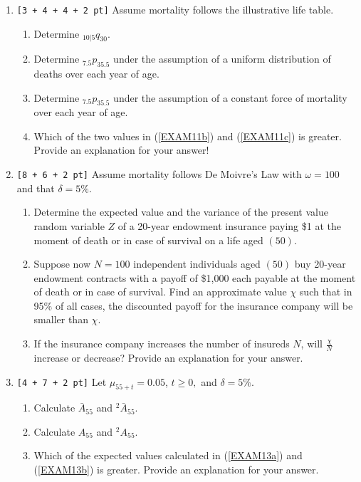 \documentclass[11pt,fleqn,oneside]{book}
\begin{document}
\begin{enumerate}

\item {\tt [3 + 4 + 4 + 2 pt]} Assume mortality follows the illustrative life table.
\begin{enumerate}
\item Determine $_{10|5}q_{30}$.
\item \label{EXAM11b} Determine ${_{7.5}p_{35.5}}$ under the assumption of a uniform distribution of deaths over each year of age.
\item \label{EXAM11c} Determine ${_{7.5}p_{35.5}}$ under the assumption of a constant force of mortality over each year of age.
\item Which of the two values in (\ref{EXAM11b}) and (\ref{EXAM11c}) is greater. Provide an explanation for your answer!
\end{enumerate}
 

\item {\tt [8 + 6 + 2 pt]} Assume mortality follows De Moivre's Law with $\omega = 100$ and that $\delta = 5\%$.
\begin{enumerate}
\item Determine the expected value and the variance of the present value random variable $Z$ of a 20-year endowment insurance paying \$1 at the moment of death or in case of survival on a life aged $(50)$.
\item Suppose now $N=100$ independent individuals aged $(50)$ buy 20-year endowment contracts with a payoff of \$1,000 each payable at the moment of death or in case of survival. Find an approximate value $\chi$ such that in 95\% of all cases, the discounted payoff for the insurance company will be smaller than ${\chi}$.
\item If the insurance company increases the number of insureds $N$, will $\frac{\chi}{N}$ increase or decrease? Provide an explanation for your answer.
\end{enumerate}


\item {\tt [4 + 7 + 2 pt]}  Let $\mu_{55+t} = 0.05$, $t\geq 0,$ and $\delta = 5\%$. 
\begin{enumerate}
\item \label{EXAM13a} Calculate $\bar{A}_{55}$ and $^2\bar{A}_{55}$.
\item \label{EXAM13b} Calculate $A_{55}$ and $^2{A}_{55}$.
\item Which of the expected values calculated in (\ref{EXAM13a}) and (\ref{EXAM13b}) is greater. Provide an explanation for your answer.
\end{enumerate}


\end{enumerate}
\end{document}
